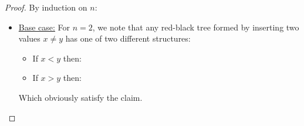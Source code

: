\documentclass[a4paper,11pt]{scrartcl}
\begin{document}
\begin{proof}
    By induction on $n$:
    \begin{itemize}
    \item \underline{Base case:} For $n = 2$, we note that any red-black tree formed by inserting two values $x \neq y$ has one of two different structures:
        \begin{itemize}
            \item If $x < y$ then: \\
            \item If $x > y$ then: \\
        \end{itemize}
            Which obviously satisfy the claim.


\end{itemize}
\end{proof}
\end{document}
